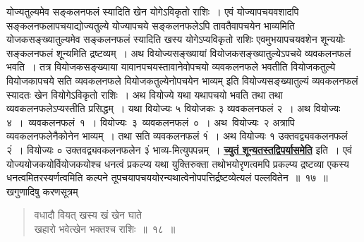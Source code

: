 \documentclass[11pt, openany]{book}
\begin{document}
\noindent योज्यतुल्यमेव सङ्कलनफलं स्यादिति खेन योगेऽविकृतो राशिः~। एवं
योज्यापचयवशादपि सङ्कलनफलापचयाद्योज्यतुल्ये योज्यापचये सङ्कलनफलेऽपि तावतैवापचयेन
भाव्यमिति योजकसङ्ख्यातुल्यमेव सङ्कलनफलं स्यादिति खस्य योगेऽप्यविकृतो
राशिः एवमुभयापचयवशेन शून्ययोः सङ्कलनफलं शून्यमिति द्रष्टव्यम्~। अथ वियोज्यसङ्ख्यायां वियोजकसङ्ख्यातुल्येऽपचये व्यवकलनफलं भवति~। तत्र
वियोजकसङ्ख्याया यावानपचयस्तावानेवोपचयो व्यवकलनफले भवतीति वियोजकतुल्ये वियोजकापचये सति व्यवकलनफले वियोजकतुल्येनोपचयेन भाव्यम् इति
वियोज्यसङ्ख्यातुल्यं व्यवकलनफलं स्यादतः खेन वियोगेऽविकृतो राशिः~। अथ
वियोज्ये यथा यथापचयो भवति तथा तथा व्यवकलनफलेऽप्यस्तीति प्रसिद्धम्~।
यथा वियोज्यः ५ वियोजकः ३ व्यवकलनफलं २~। अथ वियोज्यः \,४~। \,व्यवकलनफलं \,१~। वियोज्यः \,३ \,व्यवकलनफलं \,०~। अथ \,वियोज्यः \,२
अत्रापि व्यवकलनफलेनैकोनेन भाव्यम्~। तथा सति व्यवकलनफलं १ं~। अथ वियोज्यः १ उक्तवद्व्यवकलनफलं २ं~। वियोज्यः ० उक्तवद्व्यवकलनफलेन ३ं भाव्य-मित्युपपन्नम्~। \hyperref[16]{\textbf{च्युतं शून्यतस्तद्विपर्यासमेति}} इति~। एवं योज्ययोजकयोर्वियोजकयोश्च धनत्वं प्रकल्प्य यथा युक्तिरुक्ता तथोभयोरृणत्वमपि प्रकल्प्य द्रष्टव्या एकस्य धनत्वमितरस्यर्णत्वमिति कल्पने
तूपचयापचययोरन्यथात्वेनोपपत्तिर्द्रष्टव्येत्यलं
पल्लवितेन~॥~१७~॥\\

\vspace{-2mm}
{\bqt खगुणादिषु करणसूत्रम्\textendash }

 \label{18}
\begin{quote}
    \ab
    वधादौ वियत् खस्य खं खेन घाते\\
 खहारो भवेत्खेन भक्तश्च राशिः~॥~१८~॥
\end{quote}
 
\end{document}
